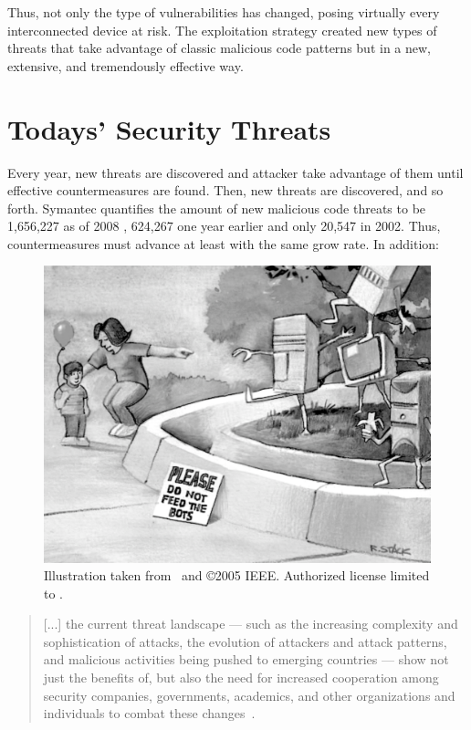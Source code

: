 Thus, not only the type of vulnerabilities has changed, posing virtually every interconnected device at risk. The exploitation strategy created new types of threats that take advantage of classic malicious code patterns but in a new, extensive, and tremendously effective way.

\section{Todays' Security Threats}
\label{introduction:motivation} Every year, new threats are discovered and attacker take advantage of them until effective countermeasures are found. Then, new threats are discovered, and so forth. \textsf{Symantec} quantifies the amount of new malicious code threats to be 1,656,227 as of 2008 \citep{symantec_threat_report_2009}, 624,267 one year earlier and only 20,547 in 2002. Thus, countermeasures must advance at least with the same grow rate. In addition:

\begin{figure}[t]
  \centering
  \includegraphics[width=\textwidth]{Figures/bots.pdf}
  \caption{Illustration taken from~\citep{holz} and \copyright 2005 IEEE. Authorized license limited to \institution.}
  \label{fig:bots}
\end{figure}

\begin{quotation}
  [...] the current threat landscape --- such as the increasing complexity and sophistication of attacks, the evolution of attackers
and attack patterns, and malicious activities being pushed to emerging countries --- show not just the benefits of, but also the need for increased cooperation among security companies, governments, academics, and other organizations and individuals to combat these changes~\citep{symantec_threat_report_2009}.
\end{quotation}

